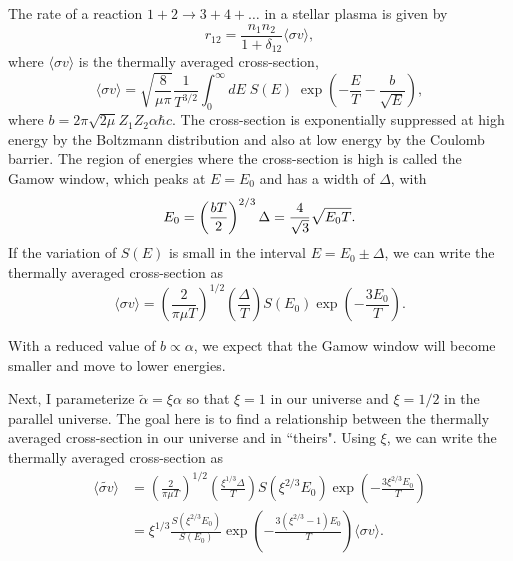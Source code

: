\documentclass[%
 reprint,
 amsmath,amssymb,
 aps,
]{revtex4-1}
\begin{document}
The rate of a reaction $1 + 2 \rightarrow 3 + 4 + \ldots$ in a stellar plasma is given by
\begin{equation}
    r_{12} = \frac{n_1 n_2}{1 + \delta_{12}} \langle \sigma v\rangle,
\end{equation}
where $\langle \sigma v \rangle$ is the thermally averaged cross-section,
\begin{equation}
    \langle \sigma v \rangle = \sqrt{\frac{8}{\mu \pi}}
    \frac{1}{T^{3/2}} \displaystyle \int_0^\infty
    dE \; S(E) \; \exp \left(
        - \frac{E}{T} - \frac{b}{\sqrt{E}}
    \right),
\end{equation}
where $b = 2 \pi \sqrt{2 \mu} Z_1 Z_2 \alpha \hbar c$. The cross-section is exponentially suppressed at high energy by the Boltzmann distribution and also at low energy by the Coulomb barrier. The region of energies where the cross-section is high is called the Gamow window, which peaks at $E = E_0$ and has a width of $\Delta$, with
\begin{equation}
    E_0 = \left( \frac{b T}{2} \right)^{2/3} \\
    \Delta = \frac{4}{\sqrt{3}} \sqrt{E_0 T}.
\end{equation}
If the variation of $S(E)$ is small in the interval $E = E_0 \pm \Delta$, we can write the thermally averaged cross-section as
\begin{equation}
    \langle \sigma v \rangle = \left( \frac{2}{\pi \mu T} \right)^{1/2}
    \left( \frac{\Delta}{T} \right) S(E_0)
    \exp \left( - \frac{3 E_0}{T} \right).
\end{equation}

With a reduced value of $b \propto \alpha$, we expect that the Gamow window will become smaller and move to lower energies.

Next, I parameterize $\widetilde{\alpha} = \xi \alpha$ so that $\xi = 1$ in our universe and $\xi = 1/2$ in the parallel universe. The goal here is to find a relationship between the thermally averaged cross-section in our universe and in ``theirs". Using $\xi$, we can write the thermally averaged cross-section as
\begin{align}
    \langle \widetilde{\sigma v} \rangle
    &= \left( \frac{2}{\pi \mu T} \right)^{1/2}
    \left( \frac{\xi^{1/3} \Delta}{T} \right)
    S\left(\xi^{2/3} E_0 \right)
    \exp \left( -\frac{3 \xi^{2/3} E_0}{T} \right) \\
    &= \xi^{1/3} \frac{S(\xi^{2/3} E_0)}{S(E_0)}
    \exp \left( - \frac{3 (\xi^{2/3} - 1) E_0}{T} \right)
    \langle \sigma v \rangle.
    \label{eq:thermal_average_xc}
\end{align}
\end{document}
